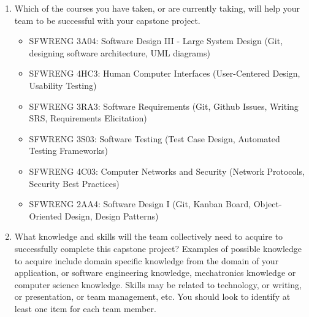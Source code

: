\begin{enumerate}
\begin{itemize}
\end{itemize}
  \item Which of the courses you have taken, or are currently taking, will help
  your team to be successful with your capstone project.
\begin{itemize}
\item SFWRENG 3A04: Software Design III - Large System Design (Git, designing software architecture, UML diagrams)
\item SFWRENG 4HC3: Human Computer Interfaces (User-Centered Design, Usability Testing)
\item SFWRENG 3RA3: Software Requirements (Git, Github Issues, Writing SRS, Requirements Elicitation)
\item SFWRENG 3S03: Software Testing (Test Case Design, Automated Testing Frameworks)
\item SFWRENG 4C03: Computer Networks and Security (Network Protocols, Security Best Practices)
\item SFWRENG 2AA4: Software Design I (Git, Kanban Board, Object-Oriented Design, Design Patterns)
\end{itemize}

  \item What knowledge and skills will the team collectively need to acquire to
  successfully complete this capstone project?  Examples of possible knowledge
  to acquire include domain specific knowledge from the domain of your
  application, or software engineering knowledge, mechatronics knowledge or
  computer science knowledge.  Skills may be related to technology, or writing,
  or presentation, or team management, etc.  You should look to identify at
  least one item for each team member.
\begin{itemize}


\end{itemize}
\end{enumerate}

